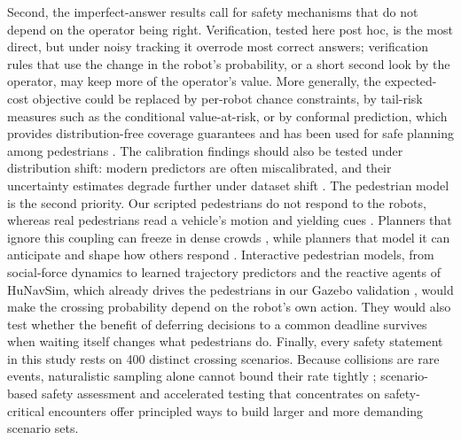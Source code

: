 \documentclass[a4paper,fleqn]{cas-dc}
\begin{document}
Second, the imperfect-answer results call for safety mechanisms that do not depend on the operator being right. Verification, tested here post hoc, is the most direct, but under noisy tracking it overrode most correct answers; verification rules that use the change in the robot's probability, or a short second look by the operator, may keep more of the operator's value. More generally, the expected-cost objective could be replaced by per-robot chance constraints, by tail-risk measures such as the conditional value-at-risk, or by conformal prediction, which provides distribution-free coverage guarantees \cite{AngelopoulosBates2023} and has been used for safe planning among pedestrians \cite{Lindemann2023}. The calibration findings should also be tested under distribution shift: modern predictors are often miscalibrated, and their uncertainty estimates degrade further under dataset shift \cite{Ovadia2019}. The pedestrian model is the second priority. Our scripted pedestrians do not respond to the robots, whereas real pedestrians read a vehicle's motion and yielding cues \cite{Rasouli2020,Domeyer2020,Markkula2020}. Planners that ignore this coupling
can freeze in dense crowds \cite{Trautman2010}, while planners that model it can anticipate and shape how others respond \cite{Sadigh2016,Schwarting2019}. Interactive pedestrian models, from social-force dynamics
\cite{HelbingMolnar1995} to learned trajectory predictors \cite{Alahi2016,Salzmann2020,Rudenko2020} and the reactive agents of HuNavSim, which already drives the pedestrians in our Gazebo validation , would make the crossing probability depend on the robot's own action. They would also test whether the benefit of deferring decisions to a common deadline survives when waiting itself changes what pedestrians do. Finally, every safety statement in this study rests on 400 distinct crossing scenarios. Because collisions are rare events, naturalistic sampling alone cannot bound their rate tightly \cite{KalraPaddock2016}; scenario-based safety assessment \cite{Riedmaier2020} and accelerated testing that concentrates on safety-critical encounters \cite{Feng2023} offer principled ways to build larger and more demanding scenario sets.
\end{document}
